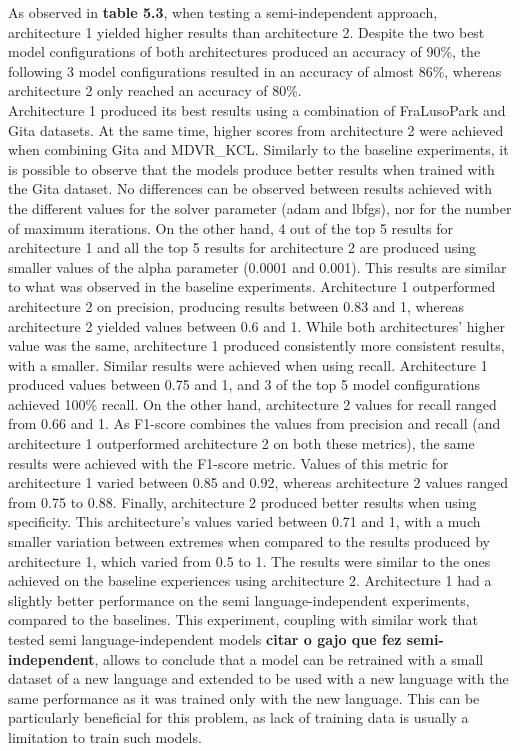 As observed in \textbf{table 5.3}, when testing a semi-independent approach, architecture 1 yielded higher results than architecture 2. Despite the two best model configurations of both architectures produced an accuracy of 90\%, the following 3 model configurations resulted in an accuracy of almost 86\%, whereas architecture 2 only reached an accuracy of 80\%.  \\
Architecture 1 produced its best results using a combination of FraLusoPark and Gita datasets. At the same time, higher scores from architecture 2 were achieved when combining Gita and MDVR\_KCL. Similarly to the baseline experiments, it is possible to observe that the models produce better results when trained with the Gita dataset. No differences can be observed between results achieved with the different values for the solver parameter (adam and lbfgs), nor for the number of maximum iterations. On the other hand, 4 out of the top 5 results for architecture 1 and all the top 5 results for architecture 2 are produced using smaller values of the alpha parameter (0.0001 and 0.001). This results are similar to what was observed in the baseline experiments.
Architecture 1 outperformed architecture 2 on precision, producing results between 0.83 and 1, whereas architecture 2 yielded values between 0.6 and 1. While both architectures' higher value was the same, architecture 1 produced consistently more consistent results, with a smaller. Similar results were achieved when using recall. Architecture 1 produced values between 0.75 and 1, and 3 of the top 5 model configurations achieved 100\% recall. On the other hand, architecture 2 values for recall ranged from 0.66 and 1. As F1-score combines the values from precision and recall (and architecture 1 outperformed architecture 2 on both these metrics), the same results were achieved with the F1-score metric. Values of this metric for architecture 1 varied between 0.85 and 0.92, whereas architecture 2 values ranged from 0.75 to 0.88. Finally, architecture 2 produced better results when using specificity. This architecture's values varied between 0.71 and 1, with a much smaller variation between extremes when compared to the results produced by architecture 1, which varied from 0.5 to 1.
The results were similar to the ones achieved on the baseline experiences using architecture 2. Architecture 1 had a slightly better performance on the semi language-independent experiments, compared to the baselines.
This experiment, coupling with similar work that tested semi language-independent models \textbf{citar o gajo que fez semi-independent}, allows to conclude that a model can be retrained with a small dataset of a new language and extended to be used with a new language with the same performance as it was trained only with the new language. This can be particularly beneficial for this problem, as lack of training data is usually a limitation to train such models.

